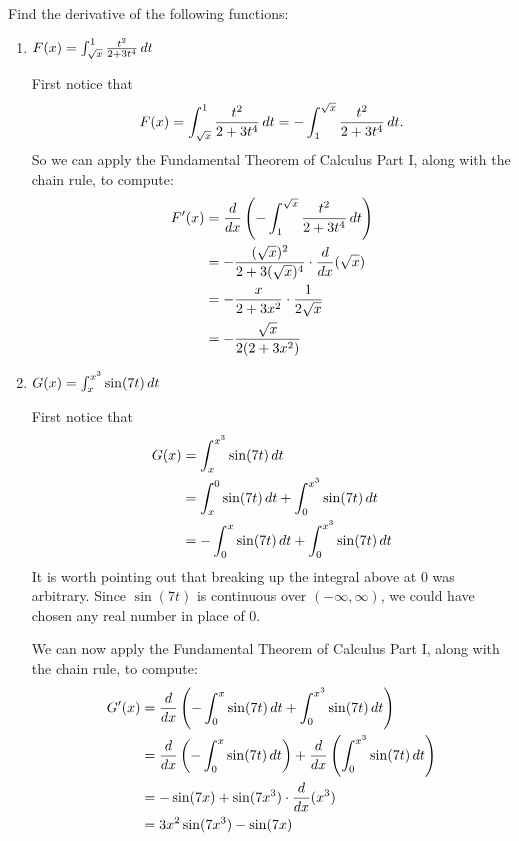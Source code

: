 \documentclass[nooutcomes]{ximera}
\begin{document}
\begin{problem}
Find the derivative of the following functions:
	\begin{enumerate}
	
	\item  $F(x) = \int_{\sqrt{x}}^1 \frac{t^2}{2 + 3t^4} \,d t$
		\begin{freeResponse}
		First notice that
		$$ F(x) = \int_{\sqrt{x}}^1 \frac{t^2}{2 + 3t^4} \,d t = - \int^{\sqrt{x}}_1 \frac{t^2}{2 + 3t^4} \,d t .$$
		So we can apply the Fundamental Theorem of Calculus Part I, along with the chain rule, to compute:
			\begin{align*}
			F^\prime (x) &= \frac{d}{dx} \left( - \int^{\sqrt{x}}_1 \frac{t^2}{2 + 3t^4} \,d t \right)  \\
			&= - \frac{(\sqrt{x})^2}{2 + 3(\sqrt{x})^4} \cdot \frac{d}{dx}(\sqrt{x})  \\
			&= - \frac{x}{2+3x^2} \cdot \frac{1}{2 \sqrt{x}}  \\
			&= - \frac{\sqrt{x}}{2(2+3x^2)}  
			\end{align*}
		\end{freeResponse}
		
		
		
	\item  $G(x) = \int_x^{x^3} \sin(7t) \,d t$
		\begin{freeResponse}
		First notice that
			\begin{align*}
			G(x) &= \int_x^{x^3} \sin(7t) \,d t  \\
			&= \int_x^0 \sin(7t) \,d t + \int_0^{x^3} \sin(7t) \,d t  \\
			&=  - \int^x_0 \sin(7t) \,d t + \int_0^{x^3} \sin(7t) \,d t
			\end{align*}
		It is worth pointing out that breaking up the integral above at $0$ was arbitrary.  Since $\sin(7t)$ is continuous over $(-\infty, \infty)$, we could have chosen any real number in place of $0$.
		
		We can now apply the Fundamental Theorem of Calculus Part I, along with the chain rule, to compute:
			\begin{align*}
			G^\prime (x) &= \frac{d}{dx} \left( - \int^x_0 \sin(7t) \,d t + \int_0^{x^3} \sin(7t) \,d t \right)  \\
			&= \frac{d}{dx} \left( - \int^x_0 \sin(7t) \,d t \right) + \frac{d}{dx} \left( \int_0^{x^3} \sin(7t) \,d t \right)  \\
			&= -\sin(7x) + \sin(7x^3) \cdot \frac{d}{dx}(x^3)  \\
			&= 3x^2 \sin(7x^3) - \sin(7x)
			\end{align*}
		\end{freeResponse}
		
		
		
	\end{enumerate}
		
		
\end{problem}
\end{document}
